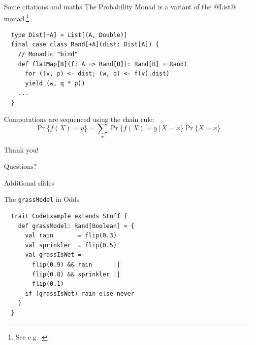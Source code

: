 \documentclass[xcolor={usenames,dvipsnames}]{beamer}
\renewcommand{\emph}[1]{\alert{#1}}
\begin{document}
\begin{frame}[fragile]{Some citations and maths}
  The \emph{Probability Monad} is a variant of the @List@
  monad.\footnote{See e.g.\ \cite{RamseyP2002popl,Gibbons2012utp}}

  \begin{lstlisting}
  type Dist[+A] = List[(A, Double)]
  final case class Rand[+A](dist: Dist[A]) {
    // Monadic "bind"
    def flatMap[B](f: A => Rand[B]): Rand[B] = Rand(
      for ((v, p) <- dist; (w, q) <- f(v).dist)
      yield (w, q * p))
    ...
  }
  \end{lstlisting}
  Computations are sequenced using the \emph{chain rule}:
  \[
  \Pr\{ f(X) = y \} = \sum_{x} \Pr\{ f(X) = y \,|\, X = x \} \Pr\{ X =
  x \}
  \]
\end{frame}

\begin{frame}{Thank you!}
  \begin{center}
    \Huge Questions?
  \end{center}
\end{frame}


\appendix
{}
\setcounter{finalframe}{\value{framenumber}}

\begin{frame}[noframenumbering]
  \begin{center}
    \emph{\LARGE Additional slides}
  \end{center}
\end{frame}

\begin{frame}[fragile]{The \texttt{grassModel} in Odds}
  \setcounter{framenumber}{\value{finalframe}}%
  \begin{lstlisting}
  trait CodeExample extends Stuff {
    def grassModel: Rand[Boolean] = {
      val rain       = flip(0.3)
      val sprinkler  = flip(0.5)
      val grassIsWet =
        flip(0.9) && rain      ||
        flip(0.8) && sprinkler ||
        flip(0.1)
      if (grassIsWet) rain else never
    }
  }
  \end{lstlisting}
\end{frame}
\end{document}
